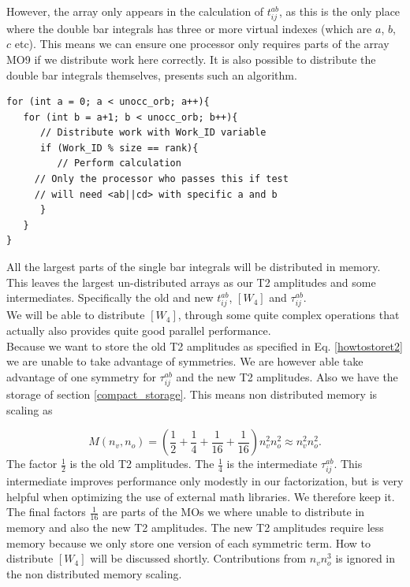 \documentclass[a4paper,norsk,11pt,twoside]{report}
\begin{document}
However, the array only appears in the calculation of $t_{ij}^{ab}$, as this is the only place where the double bar integrals has three or more virtual indexes (which are $a$, $b$, $c$ etc). This means we can ensure one processor only requires parts of the array MO9 if we distribute work here correctly. It is also possible to distribute the double bar integrals themselves, \cite{ccsd_minne_distribuert_double_bar_artikkel} presents such an algorithm. \\

\begin{lstlisting}
for (int a = 0; a < unocc_orb; a++){
   for (int b = a+1; b < unocc_orb; b++){
      // Distribute work with Work_ID variable
      if (Work_ID % size == rank){
         // Perform calculation
     // Only the processor who passes this if test
     // will need <ab||cd> with specific a and b
      }
   }
}
\end{lstlisting}

All the largest parts of the single bar integrals will be distributed in memory. This leaves the largest un-distributed arrays as our T2 amplitudes and some intermediates. Specifically the old and new $t_{ij}^{ab}$, $[W_4]$ and $\tau_{ij}^{ab}$. \\

We will be able to distribute $[W_4]$, through some quite complex operations that actually also provides quite good parallel performance. \\

Because we want to store the old T2 amplitudes as specified in Eq. \eqref{howtostoret2} we are unable to take advantage of symmetries. We are however able take advantage of one symmetry for $\tau_{ij}^{ab}$ and the new T2 amplitudes. Also we have the storage of section \ref{compact_storage}. This means non distributed memory is scaling as

\begin{equation}
M(n_v, n_o) = \left(\frac{1}{2} + \frac{1}{4} + \frac{1}{16} + \frac{1}{16} \right) n_v^2 n_o^2 \approx n_v^2 n_o^2 .
\end{equation}
The factor $\frac{1}{2}$ is the old T2 amplitudes. The $\frac{1}{4}$ is the intermediate $\tau_{ij}^{ab}$. This intermediate improves performance only modestly in our factorization, but is very helpful when optimizing the use of external math libraries. We therefore keep it. The final factors $\frac{1}{16}$ are parts of the MOs we where unable to distribute in memory and also the new T2 amplitudes. The new T2 amplitudes require less memory because we only store one version of each symmetric term. How to distribute $[W_4]$ will be discussed shortly. Contributions from $n_v n_o^3$ is ignored in the non distributed memory scaling.
\end{document}
